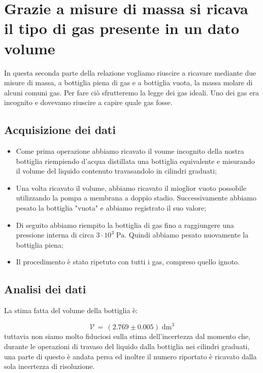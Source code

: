 \section{Grazie a misure di massa si ricava il tipo di gas presente in un dato volume}   

In questa seconda parte della relazione vogliamo riuscire a ricavare mediante due misure di massa,
a bottiglia piena di gas e a bottiglia vuota, la massa molare di alcuni comuni gas. Per fare ciò
sfrutteremo la legge dei gas ideali. Uno dei gas era incognito e dovevamo riuscire a capire quale gas fosse.

\subsection{Acquisizione dei dati}

\begin{itemize}
	\item{Come prima operazione abbiamo ricavato il voume incognito della nostra bottiglia riempiendo d'acqua distillata una bottiglia equivalente e misurando il volume del liquido contenuto travasandolo in cilindri graduati;}
	\item{Una volta ricavato il volume, abbiamo ricavato il mioglior vuoto possobile utilizzando la pompa a membrana a doppio stadio. Successivamente abbiamo pesato la bottiglia "vuota" e abbiamo registrato il suo valore;}
	\item{Di seguito abbiamo riempito la bottiglia di gas fino a raggiungere una pressione interna di circa $3 \cdot 10^3 \; \si{\pascal}$. Quindi abbiamo pesato nuovamente la bottiglia piena;}
	\item{Il procedimento è stato ripetuto con tutti i gas, compreso quello ignoto.}
\end{itemize}

\subsection{Analisi dei dati}

La stima fatta del volume della bottiglia è:

\begin{equation}
	\mathcal{V} \, = \, (2.769 \pm 0.005) \; \si{\deci\meter}^3  
\end{equation}
%
tuttavia non siamo molto fiduciosi sulla stima dell'incertezza dal momento che, durante le operazioni di
travaso del liquido dalla bottiglia nei cilindri graduati, una parte di questo è andata persa ed inoltre
il numero riportato è ricavato dalla sola incertezza di risoluzione.

